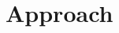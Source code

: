 \documentclass[../main.tex]{subfiles}
\begin{document}
\chapter{Approach}
\label{chap:approach}
\end{document}
